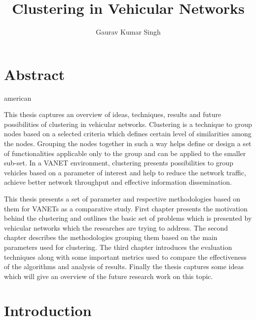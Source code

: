 \documentclass[]{ccs-thesis}
\author{Gaurav Kumar Singh}
\title{Clustering in Vehicular Networks}
\begin{document}

\maketitle

\chapter*{Abstract}
\begin{otherlanguage*}{american}

    This thesis captures an overview of ideas, techniques, results and future possibilities of clustering in vehicular networks.
    Clustering is a technique to group nodes based on a selected criteria which defines certain level of similarities among the nodes.
    Grouping the nodes together in such a way helps define or design a set of functionalities applicable only to the
    group and can be applied to the smaller sub-set. In a \ac{VANET} environment, clustering presents possibilities
    to group vehicles based on a parameter of interest and help to reduce the network traffic, achieve better network throughput and
    effective information dissemination.

    This thesis presents a set of parameter and respective methodologies based on them for \ac{VANET}s as a comparative study.
    First chapter presents the motivation behind the clustering and outlines the basic set of problems which is presented by vehicular
    networks which the researches are trying to address. The second chapter describes the methodologies grouping them based on the main
    parameters used for clustering. The third chapter introduces the evaluation techniques along with some important metrics used to
    compare the effectiveness of the algorithms and analysis of results. Finally the thesis captures some ideas which will give an
    overview of the future research work on this topic.


\end{otherlanguage*}


\acresetall

\cleardoublepage
\tableofcontents

\cleardoublepage
{}

\chapter{Introduction}
\label{sec:introduction}
\end{document}
